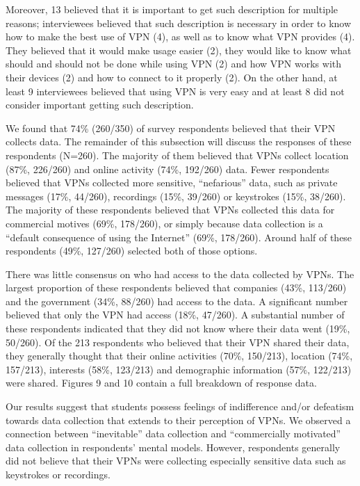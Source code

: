 Moreover, 13 believed that it is important to get such description for
multiple reasons; interviewees believed that such description is necessary in
order to know how to make the best use of VPN (4), as well as to know what VPN
provides (4). They believed that it would make usage easier (2), they would
like to know what should and should not be done while using VPN (2) and how
VPN works with their devices (2) and how to connect to it properly (2). On the
other hand, at least 9 interviewees believed that using VPN is very easy and
at least 8 did not consider important getting such description. 

We found that 74\% (260/350) of survey respondents believed that their VPN
collects data. The remainder of this subsection will discuss the responses of
these respondents (N=260). The majority of them believed that VPNs collect
location (87\%, 226/260) and online activity (74\%, 192/260) data. Fewer
respondents believed that VPNs collected more sensitive, “nefarious” data,
such as private messages (17\%, 44/260), recordings (15\%, 39/260) or
keystrokes (15\%, 38/260). The majority of these respondents believed that
VPNs collected this data for commercial motives (69\%, 178/260), or simply
because data collection is a “default consequence of using the Internet”
(69\%, 178/260). Around half of these respondents (49\%, 127/260) selected
both of those options.

There was little consensus on who had access to the data collected by VPNs.
The largest proportion of these respondents believed that companies (43\%,
113/260) and the government (34\%, 88/260) had access to the data. A
significant number believed that only the VPN had access (18\%, 47/260). A
substantial number of these respondents indicated that they did not know where
their data went (19\%, 50/260). Of the 213 respondents who believed that their
VPN shared their data, they generally thought that their online activities
(70\%, 150/213), location (74\%, 157/213), interests (58\%, 123/213) and
demographic information (57\%, 122/213) were shared. Figures 9 and 10 contain
a full breakdown of response data.

Our results suggest that students possess feelings of indifference and/or
defeatism towards data collection that extends to their perception of VPNs. We
observed a connection between “inevitable” data collection and “commercially
motivated” data collection in respondents’ mental models. However, respondents
generally did not believe that their VPNs were collecting especially sensitive
data such as keystrokes or recordings.



